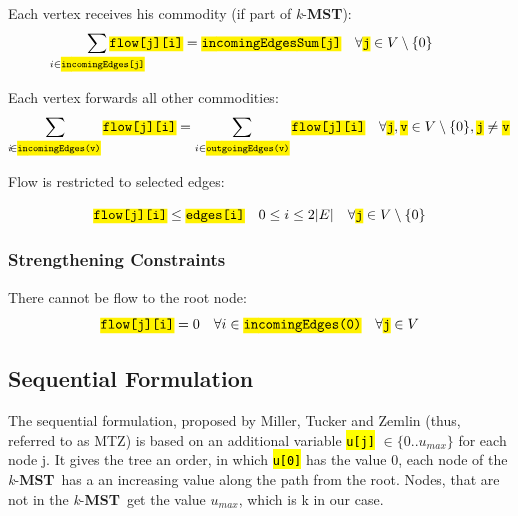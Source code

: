 \documentclass[,%
			paper=a4,%
			DIV14,
			liststotoc,
			bibtotoc,
			draft=false,%
			numbers=noendperiod
			]{scrartcl}
\newcommand{\mst}{\textbf{MST}}
\newcommand{\kmst}{\textit{k}-\mst}
\newcommand{\ilc}[1]{\hl{\texttt{#1}}} %
\newcommand{\commodity}{j}
\newcommand{\vertex}{j}
\newcommand{\edge}{i}
\newcommand{\forallEdges}{\ensuremath{0 \leq \edge \leq 2|E|}}
\begin{document}
Each vertex receives his commodity (if part of \kmst):
\begin{equation}\label{eq:mfcRec}
	\sum_{\mathclap{\edge \in \ilc{incomingEdges[j]}}} \ilc{flow[\commodity][\edge]} 
 = \ilc{incomingEdgesSum[\commodity]}
\quad \forall \ilc{\commodity} \in V  \setminus \{0\}
\end{equation}

Each vertex forwards all other commodities:
\begin{equation}\label{eq:mfcForward}
\begin{split}
\sum_{\mathclap i \in \ilc{incomingEdges(v)}} \ilc{flow[\commodity][i]} = \sum_{ i \in \ilc{outgoingEdges(v)}} \ilc{flow[\commodity][i]} 
\quad \forall \ilc{\commodity}, \ilc{v} \in V  \setminus \{0\}
, \ilc{\commodity} \neq \ilc{v}
\end{split}
\end{equation}

Flow is restricted to selected edges:

\begin{equation}\label{eq:mfcFlowEdge}
 \ilc{flow[\commodity][\edge]} \leq \ilc{edges[\edge]}
 \quad \forallEdges 
\quad \forall \ilc{\commodity} \in V  \setminus \{0\}
\end{equation}

\subsubsection{Strengthening Constraints}

There cannot be flow to the root node:
\begin{equation}\label{eq:mfcNoFlow}
 \ilc{flow[\commodity][i]} = 0
\quad \forall i \in \ilc{incomingEdges(0)}  
\quad \forall \ilc{\commodity} \in V
\end{equation}


\subsection{Sequential Formulation}
The sequential formulation, proposed by Miller, Tucker and Zemlin (thus, referred to as MTZ) is  based on an additional variable \ilc{u[\vertex]} $\in \{0..u_{max}\}$ for each node \vertex. It gives the tree an order, in which \ilc{u[0]} has the value 0, each node of the \kmst\ has a an increasing value along the path from the root. Nodes, that are not in the \kmst\ get the value $u_{max}$, which is k in our case.
\end{document}
